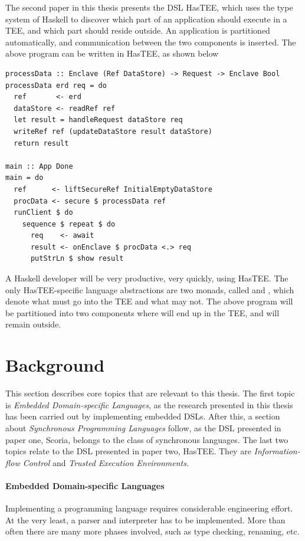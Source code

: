 The second paper in this thesis presents the DSL HasTEE, which uses the type system of Haskell to discover which part of
an application should execute in a TEE, and which part should reside outside. An application is partitioned automatically,
and communication between the two components is inserted. The above program can be written in HasTEE, as shown below

\begin{verbatim}
processData :: Enclave (Ref DataStore) -> Request -> Enclave Bool
processData erd req = do
  ref       <- erd
  dataStore <- readRef ref
  let result = handleRequest dataStore req
  writeRef ref (updateDataStore result dataStore)
  return result

main :: App Done
main = do
  ref      <- liftSecureRef InitialEmptyDataStore
  procData <- secure $ processData ref
  runClient $ do
    sequence $ repeat $ do
      req    <- await
      result <- onEnclave $ procData <.> req
      putStrLn $ show result
\end{verbatim}

A Haskell developer will be very productive, very quickly, using HasTEE. The only HasTEE-specific language abstractions are
two monads, called  and , which denote what must go into the TEE and what may not. The above
program will be partitioned into two components where  will end up in the TEE, and  will
remain outside.

\section{Background}

This section describes core topics that are relevant to this thesis. The first topic is \textit{Embedded Domain-specific Languages},
as the research presented in this thesis has been carried out by implementing embedded DSLs.
After this, a section about \textit{Synchronous Programming Languages} follow, as the DSL presented in paper one, Scoria, belongs
to the class of synchronous languages.
The last two topics relate to the DSL presented in paper two, HasTEE. They are \textit{Information-flow Control} and
\textit{Trusted Execution Environments}.

\paragraph{Embedded Domain-specific Languages}

Implementing a programming language requires considerable engineering effort. At the very least, a parser and interpreter
has to be implemented. More than often there are many more phases involved, such as type checking, renaming, etc.

